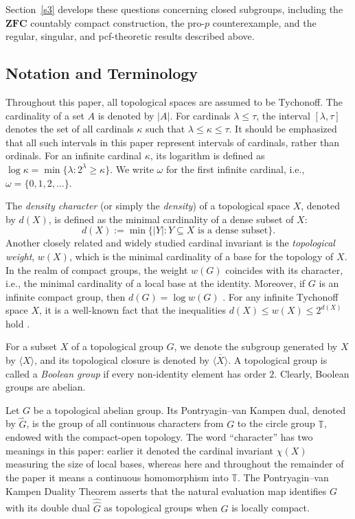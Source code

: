\documentclass[12pt]{amsart}
\theoremstyle{definition}
\numberwithin{equation}{section}
\theoremstyle{remark}
\def\hull#1{\langle#1\rangle}
\begin{document}
Section~\ref{s3} develops these questions concerning closed subgroups,
including the $\mathbf{ZFC}$ countably compact construction, the
pro-$p$ counterexample, and the regular, singular, and pcf-theoretic
results described above.




\subsection{Notation and Terminology}

Throughout this paper, all topological spaces are assumed to be Tychonoff. 
The cardinality of a set $A$ is denoted by $|A|$. For cardinals $\lambda \le \tau$, the interval $[\lambda, \tau]$ denotes the set of all cardinals $\kappa$ such that $\lambda \le \kappa \le \tau$. It should be emphasized that all such intervals in this paper represent intervals of cardinals, rather than ordinals. For an infinite cardinal $\kappa$, its logarithm is defined as $\log\kappa = \min\{\lambda : 2^\lambda \ge \kappa\}$.  We write $\omega$ for the first infinite cardinal, i.e., $\omega=\{0,1,2,\ldots\}$.

The \emph{density character} (or simply the \emph{density}) of a topological space $X$, denoted by $d(X)$, is defined as the minimal cardinality of a dense subset of $X$:
\[ d(X) := \min \{ |Y| : Y \subseteq X \text{ is a dense subset} \}. \]
Another closely related and widely studied cardinal invariant is the \emph{topological weight}, $w(X)$, which is the minimal cardinality of a base for the topology of $X$. In the realm of compact groups, the weight $w(G)$ coincides with its character, i.e., the minimal cardinality of a local base at the identity. Moreover, if $G$ is an infinite compact group, then $d(G)=\log w(G)$ \cite{AT}.
For any infinite Tychonoff space $X$, it is a well-known fact that the inequalities $d(X) \le w(X) \le 2^{d(X)}$ hold \cite{Eng}.


For a subset $X$ of a topological group $G$, we denote the subgroup generated by $X$ by $\hull{X}$, and its topological closure is denoted by $\overline{\hull{X}}$. A topological group is called a \emph{Boolean group} if every non-identity element has order $2$. Clearly, Boolean groups are abelian.

Let $G$ be a topological abelian group. Its Pontryagin--van Kampen dual, denoted by $\widehat{G}$, is the group of all continuous characters from $G$ to the circle group $\mathbb{T}$, endowed with the compact-open topology. The word ``character'' has two meanings in this paper: earlier it denoted the cardinal invariant $\chi(X)$ measuring the size of local bases, whereas here and throughout the remainder of the paper it means a continuous homomorphism into $\mathbb{T}$. The Pontryagin--van Kampen Duality Theorem asserts that the natural evaluation map identifies $G$ with its double dual $\widehat{\widehat{G}}$ as topological groups when $G$ is locally compact.
\end{document}
